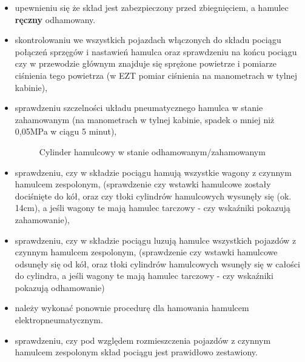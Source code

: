 \begin{itemize}
	\item upewnieniu się że skład jest zabezpieczony przed zbiegnięciem, a hamulec \textbf{ręczny} odhamowany.
	\item skontrolowaniu we wszystkich pojazdach włączonych do składu pociągu połączeń sprzęgów i nastawień hamulca oraz sprawdzeniu na końcu pociągu czy w przewodzie głównym znajduje się sprężone powietrze i pomiarze ciśnienia tego powietrza (w EZT pomiar ciśnienia na manometrach w tylnej kabinie), 
	\item sprawdzeniu szczelności układu pneumatycznego hamulca w stanie zahamowanym (na manometrach w tylnej kabinie, spadek o mniej niż 0,05MPa w ciągu 5 minut), 
	\begin{figure}
	\caption{Cylinder hamulcowy w stanie odhamowanym/zahamowanym}
\end{figure}

	\item sprawdzeniu, czy w składzie pociągu hamują wszystkie wagony z czynnym hamulcem zespolonym, (sprawdzenie czy wstawki hamulcowe zostały dociśnięte do kół, oraz czy tłoki cylindrów hamulcowych wysunęły się (ok. 14cm), a jeśli wagony te mają hamulec tarczowy - czy wskaźniki pokazują zahamowanie), 
	
	\item sprawdzeniu, czy w składzie pociągu luzują hamulce wszystkich pojazdów z czynnym hamulcem zespolonym, (sprawdzenie czy wstawki hamulcowe odsunęły się od kół, oraz tłoki cylindrów hamulcowych wsunęły się w całości do cylindra, a jeśli wagony te mają hamulec tarczowy - czy wskaźniki pokazują odhamowanie)
	\item należy wykonać ponownie procedurę dla hamowania hamulcem elektropneumatycznym.
	\item sprawdzeniu, czy pod względem rozmieszczenia pojazdów z czynnym hamulcem zespolonym skład pociągu jest prawidłowo zestawiony.


\end{itemize}
